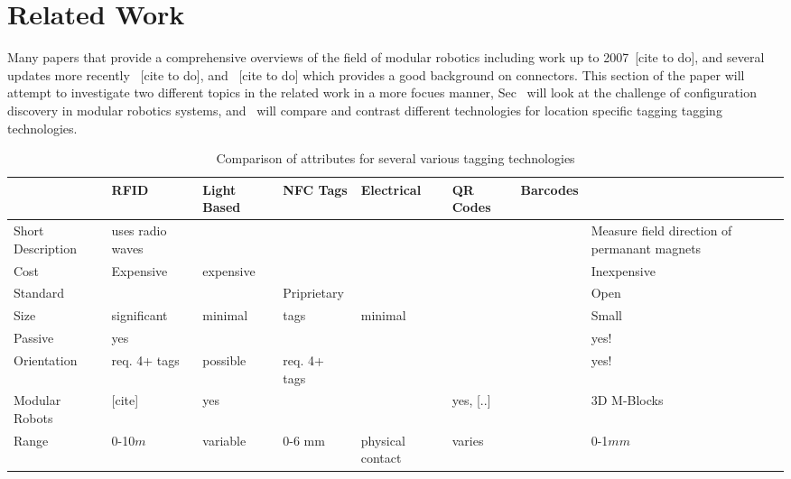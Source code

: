 \section{Related Work}
\label{sec:RelatedWork}

Many papers that provide a comprehensive overviews of the field of modular robotics including work up to 2007~[cite to do], and several updates more recently ~[cite to do], and ~[cite to do] which provides a good background on connectors. This section of the paper will attempt to investigate two different topics in the related work in a more focues manner, Sec~\label{sec:RWconfiguration} will look at the challenge of configuration discovery in modular robotics systems, and~\label{sec:RWtaggingTech} will compare and contrast different technologies for location specific tagging tagging technologies.

\begin{table*}[t]
	\centering
	\caption{Comparison of attributes for several various tagging technologies}
	\newcommand{\wdd}{1.8cm}
	\begin{tabular}{ p{\wdd} |p{\wdd}  p{\wdd} p{\wdd} p{\wdd} p{\wdd} p{\wdd} p{\wdd}  }
		\hline
		& RFID 				%
		& Light Based		%
		& NFC Tags 			%
		& Electrical 		%
		& QR Codes 			%
		& Barcodes			%
		& \tagNamePlural \\ %
		\hline
		Short Description		& uses radio waves	& 			& 			& 					& 			& 	  	& Measure field direction of permanant magnets \\

		Cost			& Expensive	& expensive	& 			& 					& 			& 	  	& Inexpensive \\
		Standard		& 			&  			& Priprietary	& 					& 			& 	  						& Open \\
		Size 			& significant & minimal & tags  	& minimal	  				&       	&     	& Small		  \\
		Passive 		& yes		& 			&  			&	 				&			& 		& yes!		  \\
		Orientation 	& req. 4+ tags 		& possible 	& req. 4+ tags 	&	 				&	  		& 		& yes!		\\
		Modular Robots 	& [cite]	& yes		&	  		&					& yes, [..]	& 		& 3D M-Blocks\\
		Range			& 0-10$m$	& variable	& 0-6 mm	& physical contact	& varies	&		& 0-1$mm$	\\
	\end{tabular}
	\label{tab:tagTech}
\end{table*}

